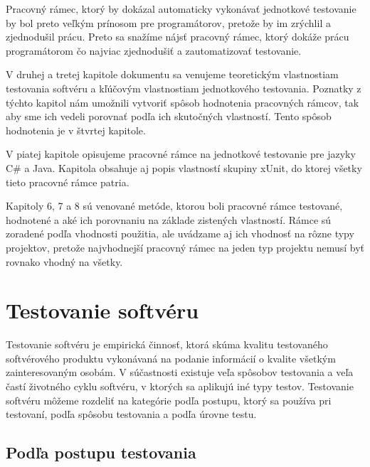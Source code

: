 \documentclass[11pt,twoside,slovak,a4paper]{article}
\begin{document}
	Pracovný rámec, ktorý by dokázal automaticky vykonávať jednotkové testovanie by bol preto veľkým prínosom pre programátorov, pretože by im zrýchlil a zjednodušil prácu. Preto sa snažíme nájsť pracovný rámec, ktorý dokáže prácu programátorom čo najviac zjednodušiť a zautomatizovať testovanie.
	
	V druhej a tretej kapitole dokumentu sa venujeme teoretickým vlastnostiam testovania softvéru a kľúčovým vlastnostiam jednotkového testovania. Poznatky z týchto kapitol nám umožnili vytvoriť spôsob hodnotenia pracovných rámcov, tak aby sme ich vedeli porovnať podľa ich skutočných vlastností. Tento spôsob hodnotenia je v štvrtej kapitole.
	
	V piatej kapitole opisujeme pracovné rámce na jednotkové testovanie pre jazyky C\# a Java. Kapitola obsahuje aj popis vlastností skupiny xUnit, do ktorej všetky tieto pracovné rámce patria.
	
	Kapitoly 6, 7 a 8 sú venované metóde, ktorou boli pracovné rámce testované, hodnotené a aké ich porovnaniu na základe zistených vlastností. Rámce sú zoradené podľa vhodnosti použitia, ale uvádzame aj ich vhodnosť na rôzne typy projektov, pretože najvhodnejší pracovný rámec na jeden typ projektu nemusí byť rovnako vhodný na všetky.	
	
	\newpage
	\thispagestyle{plain}
	\section{Testovanie softvéru}
	Testovanie softvéru je empirická činnosť, ktorá skúma kvalitu testovaného softvérového produktu vykonávaná na podanie informácií o kvalite všetkým zainteresovaným osobám\cite{Kaner2006}. V súčastnosti existuje veľa spôsobov testovania a veľa častí životného cyklu softvéru, v ktorých sa aplikujú iné typy testov. Testovanie softvéru môžeme rozdeliť na kategórie podľa postupu, ktorý sa používa pri testovaní, podľa spôsobu testovania a podľa úrovne testu.
	
	\subsection{Podľa postupu testovania}
\end{document}
